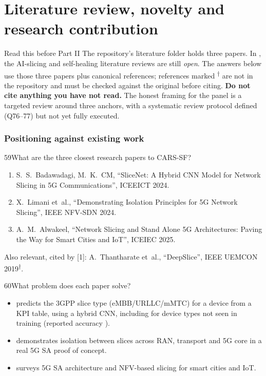 \part{Literature review, novelty and research contribution}

\begin{warnbox}{Read this before Part II}
The repository's literature folder holds three papers. In , the AI-slicing and self-healing literature
reviews are still \emph{open}. The answers below use those three papers plus canonical references; references marked
\textsuperscript{†} are not in the repository and must be checked against the original before citing.
\textbf{Do not cite anything you have not read.} The honest framing for the panel is a targeted review around
three anchors, with a systematic review protocol defined (Q76--77) but not yet fully executed.
\end{warnbox}

\section{Positioning against existing work}

\begin{qa}{59}{What are the three closest research papers to CARS-SF?}
\begin{enumerate}[leftmargin=1.3em]
\item S.~S.~Badawadagi, M.~K.~CM, ``SliceNet: A Hybrid CNN Model for Network Slicing in 5G Communications'', ICEEICT 2024.
\item X.~Limani et~al., ``Demonstrating Isolation Principles for 5G Network Slicing'', IEEE NFV-SDN 2024.
\item A.~M.~Alwakeel, ``Network Slicing and Stand Alone 5G Architectures: Paving the Way for Smart Cities and IoT'', ICEIEC 2025.
\end{enumerate}
Also relevant, cited by [1]: A.~Thantharate et~al., ``DeepSlice'', IEEE UEMCON 2019\textsuperscript{†}.
\end{qa}

\begin{qa}{60}{What problem does each paper solve?}
\begin{itemize}
\item [1] predicts the 3GPP slice type (eMBB/URLLC/mMTC) for a device from a KPI table, using a hybrid CNN, including
for device types not seen in training (reported accuracy \NPaperSnAcc).
\item [2] demonstrates isolation between slices across RAN, transport and 5G core in a real 5G SA proof of concept.
\item [3] surveys 5G SA architecture and NFV-based slicing for smart cities and IoT.
\end{itemize}
\end{qa}

